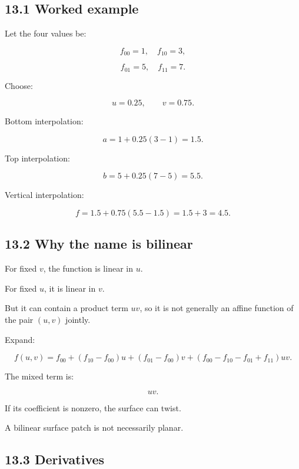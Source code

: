 \begin{allmightroleexample}

\subsection{13.1 Worked example}\label{02-foundations-ii-ch028-worked-example-2}

\hypertarget{02-foundations-ii-ch028-worked-example-2}{}

Let the four values be:

\end{allmightroleexample}

\[ f_{00}=1,\quad f_{10}=3, \]

\[ f_{01}=5,\quad f_{11}=7. \]

Choose:

\[ u=0.25,\qquad v=0.75. \]

Bottom interpolation:

\[ a=1+0.25(3-1)=1.5. \]

Top interpolation:

\[ b=5+0.25(7-5)=5.5. \]

Vertical interpolation:

\[ f=1.5+0.75(5.5-1.5) =1.5+3 =\boxed{4.5}. \]

\subsection{13.2 Why the name is bilinear}\label{02-foundations-ii-ch028-why-the-name-is-bilinear}

\hypertarget{02-foundations-ii-ch028-why-the-name-is-bilinear}{}

For fixed \(v\), the function is linear in \(u\).

For fixed \(u\), it is linear in \(v\).

But it can contain a product term \(uv\), so it is not generally an affine function of the pair \((u,v)\) jointly.

Expand:

\[ f(u,v) = f_{00} +(f_{10}-f_{00})u +(f_{01}-f_{00})v +(f_{00}-f_{10}-f_{01}+f_{11})uv. \]

The mixed term is:

\[ uv. \]

If its coefficient is nonzero, the surface can twist.

A bilinear surface patch is not necessarily planar.

\subsection{13.3 Derivatives}\label{02-foundations-ii-ch028-derivatives}

